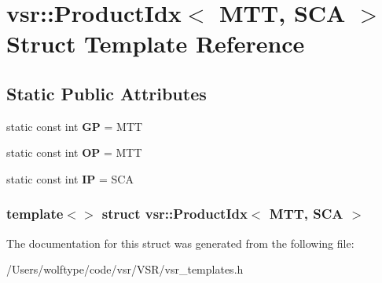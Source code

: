 \hypertarget{structvsr_1_1_product_idx_3_01_m_t_t_00_01_s_c_a_01_4}{\section{vsr\-:\-:Product\-Idx$<$ M\-T\-T, S\-C\-A $>$ Struct Template Reference}
\label{structvsr_1_1_product_idx_3_01_m_t_t_00_01_s_c_a_01_4}
}
\subsection*{Static Public Attributes}
\begin{DoxyCompactItemize}
\item 
\hypertarget{structvsr_1_1_product_idx_3_01_m_t_t_00_01_s_c_a_01_4_afb552f7c36fa4fd102b6921612adfefe}{static const int {\bfseries G\-P} = M\-T\-T}\label{structvsr_1_1_product_idx_3_01_m_t_t_00_01_s_c_a_01_4_afb552f7c36fa4fd102b6921612adfefe}

\item 
\hypertarget{structvsr_1_1_product_idx_3_01_m_t_t_00_01_s_c_a_01_4_a90e4b9c27c26a0df16af44720fea09b7}{static const int {\bfseries O\-P} = M\-T\-T}\label{structvsr_1_1_product_idx_3_01_m_t_t_00_01_s_c_a_01_4_a90e4b9c27c26a0df16af44720fea09b7}

\item 
\hypertarget{structvsr_1_1_product_idx_3_01_m_t_t_00_01_s_c_a_01_4_aed34ec1c7c2585f020a23d137a6fb544}{static const int {\bfseries I\-P} = S\-C\-A}\label{structvsr_1_1_product_idx_3_01_m_t_t_00_01_s_c_a_01_4_aed34ec1c7c2585f020a23d137a6fb544}

\end{DoxyCompactItemize}
\subsubsection*{template$<$$>$ struct vsr\-::\-Product\-Idx$<$ M\-T\-T, S\-C\-A $>$}



The documentation for this struct was generated from the following file\-:\begin{DoxyCompactItemize}
\item 
/\-Users/wolftype/code/vsr/\-V\-S\-R/vsr\-\_\-templates.\-h\end{DoxyCompactItemize}
